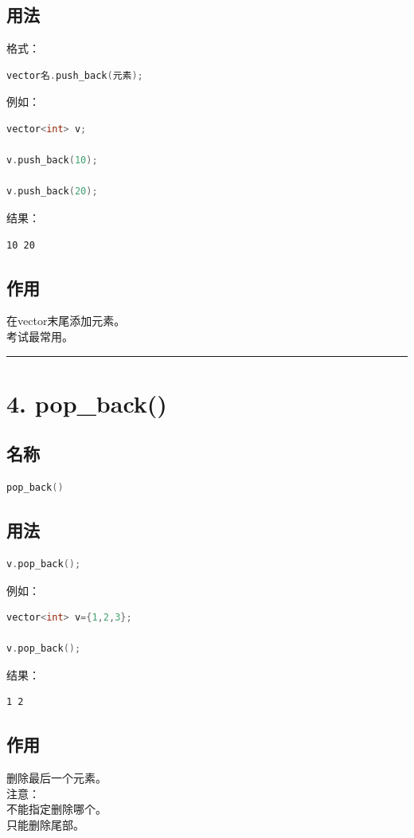 \documentclass[9pt,twocolumn]{extarticle}
\begin{document}
\subsection{用法}
格式：
\begin{lstlisting}[language=C++]
vector名.push_back(元素);
\end{lstlisting}
例如：
\begin{lstlisting}[language=C++]
vector<int> v;

v.push_back(10);

v.push_back(20);
\end{lstlisting}
结果：
\begin{lstlisting}
10 20
\end{lstlisting}

\subsection{作用}
在vector末尾添加元素。\\
考试最常用。

\noindent\rule{\linewidth}{0.4pt}

\section{4. pop\_back()}

\subsection{名称}
\begin{lstlisting}[language=C++]
pop_back()
\end{lstlisting}

\subsection{用法}
\begin{lstlisting}[language=C++]
v.pop_back();
\end{lstlisting}
例如：
\begin{lstlisting}[language=C++]
vector<int> v={1,2,3};

v.pop_back();
\end{lstlisting}
结果：
\begin{lstlisting}
1 2
\end{lstlisting}

\subsection{作用}
删除最后一个元素。\\
注意：\\
不能指定删除哪个。\\
只能删除尾部。
\end{document}
